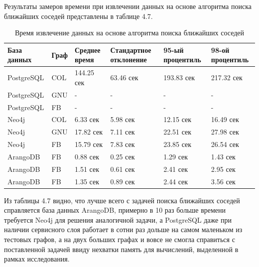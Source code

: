 Результаты замеров времени при извлечении данных на основе алгоритма поиска ближайших соседей представлены в таблице 4.7.

\begin{table} [htbp]
    \centering\small
    \caption{Время извлечение данных на основе алгоритма поиска ближайших соседей}
    \begin{tabular}{|p{3cm}|p{1cm}|p{2cm}|p{2cm}|p{2cm}|p{2cm}|}
        \hline
        База данных & Граф & Среднее время & Стандартное отклонение & 95-ый процентиль & 98-ой процентиль \\ \hline
        PostgreSQL  & COL  & 144.25 сек    & 63.46 сек              & 193.83 сек       & 217.32 сек       \\ \hline
        PostgreSQL  & GNU  & -             & -                      & -                & -                \\ \hline
        PostgreSQL  & FB   & -             & -                      & -                & -                \\ \hline
        Neo4j       & COL  & 6.33 сек      & 5.98 сек               & 12.15 сек        & 16.49 сек        \\ \hline
        Neo4j       & GNU  & 17.82 сек     & 7.11 сек               & 22.51 сек        & 27.98 сек        \\ \hline
        Neo4j       & FB   & 15.79 сек     & 7.83 сек               & 23.85 сек        & 26.54 сек        \\ \hline
        ArangoDB    & FB   & 0.88 сек      & 0.25 сек               & 1.29 сек         & 1.43 сек         \\ \hline
        ArangoDB    & FB   & 1.51 сек      & 0.61 сек               & 2.41 сек         & 2.95 сек         \\ \hline
        ArangoDB    & FB   & 1.35 сек      & 0.89 сек               & 2.44 сек         & 3.56 сек         \\ \hline
    \end{tabular}
    \normalsize
\end{table}

Из таблицы 4.7 видно, что лучше всего с задачей поиска ближайших соседей справляется база данных ArangoDB, примерно в 10 раз больше времени требуется Neo4j для решения аналогичной задачи, а PostgreSQL даже при наличии сервисного слоя работает в сотни раз дольше на самом маленьком из тестовых графов, а на двух больших графах и вовсе не смогла справиться с поставленной задачей ввиду нехватки память для вычислений, выделенной в рамках исследования.


